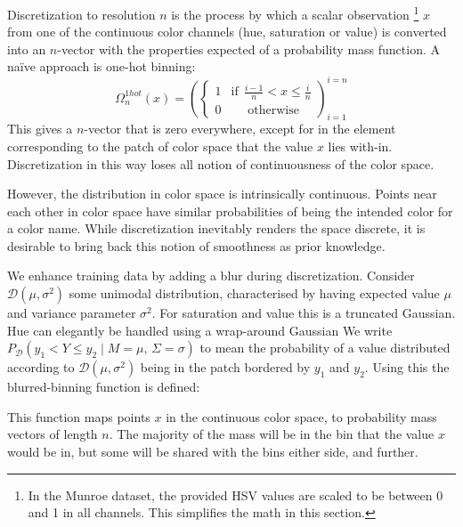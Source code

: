\documentclass[11pt,a4paper]{article}
\newcommand{\compactmath}[1]{\noindent\resizebox{\columnwidth}{!}{$#1$}}
\begin{document}
Discretization to resolution $n$ is the process by which a scalar observation%
\footnote{In the Munroe dataset, the provided HSV values are scaled to be between 0 and 1 in all channels. This simplifies the math in this section.}
 $x$
from one of the continuous color channels (hue, saturation or value) is converted into an $n$-vector with the properties expected of a probability mass function.
A na{\"i}ve approach is one-hot binning:
\[\Omega_{n}^{1hot}(x)=\left(\begin{cases}
1 & \mathrm{if}\:\:\frac{i-1}{n}<x\le\frac{i}{n}\\
0 & \:\:\:\:\:\:\mathrm{otherwise}
\end{cases}\right)_{i=1}^{i=n}
\]
This gives a $n$-vector that is zero everywhere, except for in the element corresponding to the patch of color space that the value $x$ lies with-in.
Discretization in this way loses all notion of continuousness of the color space.

However, the distribution in color space is intrinsically continuous.
Points near each other in color space have similar probabilities of being the intended color for a color name.
While discretization inevitably renders the space discrete, it is desirable to bring back this notion of smoothness as prior knowledge.

We enhance training data by adding a blur during discretization.
Consider $\mathcal{D}(\mu,\sigma^{2})$ some unimodal distribution, characterised by having expected value $\mu$ and variance parameter $\sigma^{2}$.
For saturation and value this is a truncated Gaussian.
Hue can elegantly be handled using a wrap-around Gaussian%
We write $P_{\mathcal{D}}(y_{1}<Y\le y_{2}\mid M=\mu,\,\Sigma=\sigma)$ to mean the probability of a value distributed according to $\mathcal{D}(\mu,\sigma^{2})$ being in the patch bordered by $y_1$ and $y_2$.
Using this the blurred-binning function is defined: 

\compactmath{\Omega_{n}^{blur}(x,\mathcal{D},\sigma)=\left(P_{\mathcal{D}}\left(\dfrac{i-1}{n}<Y\le\dfrac{i}{n}\mid M=x,\,\Sigma=\sigma\right)\right)_{i=1}^{i=n}}
This function maps points $x$ in the continuous color space, to probability mass vectors of length $n$.
The majority of the mass will be in the bin that the value $x$ would be in,
but some will be shared with the bins either side, and further.
\end{document}
